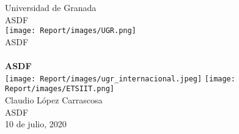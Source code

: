 \documentclass[12pt]{article}
\begin{document}


\begin{center}
\thispagestyle{empty}
{\LARGE Universidad de Granada}\\[.5cm]
{\Large ASDF}\\[1cm]
\texttt{[image: Report/images/UGR.png]}\\[1cm]
{\Large ASDF\\~\\}
{\huge \bfseries ASDF}\\[1.5cm]
\linespread{1}
\vspace{\fill}
\texttt{[image: Report/images/ugr\_internacional.jpeg]}\hspace{1cm}
\texttt{[image: Report/images/ETSIIT.png]}\\[1cm]
{\Large Claudio López Carrascosa}\\[0.5cm]
{\Large ASDF}\\[0.5cm]
{\Large 10 de julio, 2020}
\end{center}

\clearpage
{}

\newpage





\newpage

\begin{appendices}

\end{appendices}
\end{document}
